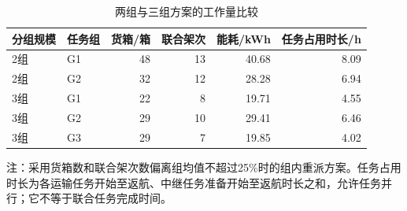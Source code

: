 \begin{table}[htbp]
\centering
\small
\caption{两组与三组方案的工作量比较}
\label{tab:q4-workload}
\setlength{\tabcolsep}{6pt}
\renewcommand{\arraystretch}{1.2}
\begin{tabular}{llrrrr}
\toprule
分组规模 & 任务组 & 货箱/箱 & 联合架次 & 能耗/kWh & 任务占用时长/h \\
\midrule
2组 & G1 & 48 & 13 & 40.68 & 8.09 \\
2组 & G2 & 32 & 12 & 28.28 & 6.94 \\
3组 & G1 & 22 & 8 & 19.71 & 4.55 \\
3组 & G2 & 29 & 10 & 29.41 & 6.46 \\
3组 & G3 & 29 & 7 & 19.85 & 4.02 \\
\bottomrule
\end{tabular}
\par\smallskip
\begin{minipage}{0.98\linewidth}
\footnotesize 注：采用货箱数和联合架次数偏离组均值不超过25\%时的组内重派方案。任务占用时长为各运输任务开始至返航、中继任务准备开始至返航时长之和，允许任务并行；它不等于联合任务完成时间。
\end{minipage}
\end{table}
